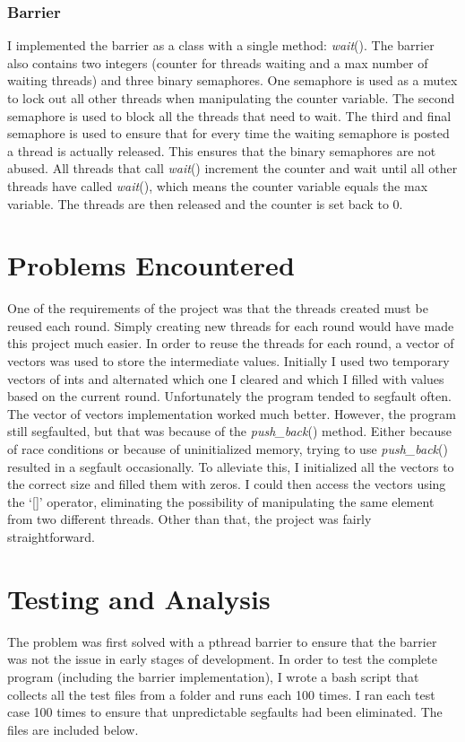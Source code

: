 \documentclass[12pt,letter,titlepage]{article}
\begin{document}
\subsubsection*{Barrier}{
I implemented the barrier as a class with a single method: \textit{\color{cyan} wait\color{black}}(). The barrier also contains two integers (counter for threads waiting and a max number of waiting threads) and three binary semaphores. One semaphore is used as a mutex to lock out all other threads when manipulating the counter variable. The second semaphore is used to block all the threads that need to wait. The third and final semaphore is used to ensure that for every time the waiting semaphore is posted a thread is actually released. This ensures that the binary semaphores are not abused. All threads that call \textit{\color{cyan} wait\color{black}}() increment the counter and wait until all other threads have called \textit{\color{cyan} wait\color{black}}(), which means the counter variable equals the max variable. The threads are then released and the counter is set back to 0.
}

\section*{Problems Encountered}
One of the requirements of the project was that the threads created must be reused each round. Simply creating new threads for each round would have made this project much easier. In order to reuse the threads for each round, a vector of vectors was used to store the intermediate values. Initially I used two temporary vectors of ints and alternated which one I cleared and which I filled with values based on the current round. Unfortunately the program tended to segfault often. The vector of vectors implementation worked much better. However, the program still segfaulted, but that was because of the \textit{\color{cyan} push\_back\color{black}}() method. Either because of race conditions or because of uninitialized memory, trying to use \textit{\color{cyan} push\_back\color{black}}() resulted in a segfault occasionally. To alleviate this, I initialized all the vectors to the correct size and filled them with zeros. I could then access the vectors using the `[]' operator, eliminating the possibility of manipulating the same element from two different threads. Other than that, the project was fairly straightforward.

\section*{Testing and Analysis}
The problem was first solved with a pthread barrier to ensure that the barrier was not the issue in early stages of development. In order to test the complete program (including the barrier implementation), I wrote a bash script that collects all the test files from a folder and runs each 100 times. I ran each test case 100 times to ensure that unpredictable segfaults had been eliminated. The files are included below.
\end{document}
